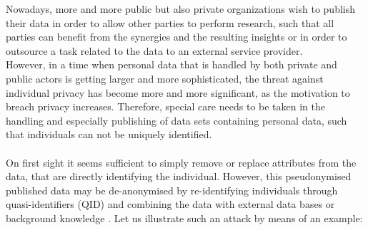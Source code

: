 Nowadays, more and more public but also private organizations wish to publish their data in order to allow other parties to perform research, such that all parties can benefit from the synergies and the resulting insights or in order to outsource a task related to the data to an external service provider. \\
However, in a time when personal data that is handled by both private and public actors is getting larger and more sophisticated, the threat against individual privacy has become more and more significant, as the motivation to breach privacy increases. Therefore, special care needs to be taken in the handling and especially publishing of data sets containing personal data, such that individuals can not be uniquely identified. \\
\\
On first sight it seems sufficient to simply remove or replace attributes from the data, that are directly identifying the individual. However, this pseudonymised published data may be de-anonymised by re-identifying individuals through quasi-identifiers (QID) and combining the data with external data bases or background knowledge \cite{CpppOfDataStreams}. Let us illustrate such an attack by means of an example:

